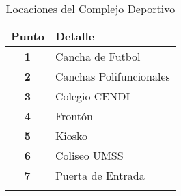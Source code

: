     \begin{longtable}{ c  X }
      \toprule
        \textbf{Punto} &
        \textbf{Detalle}\\

      \midrule
      \endhead

  \textbf{1}
  &
  Cancha de Futbol
  \\
  \textbf{2}
  &
  Canchas Polifuncionales
  \\
  \textbf{3}
  &
  Colegio CENDI
  \\
  \textbf{4}
  &
  Frontón
  \\
  \textbf{5}
  &
  Kiosko
  \\
  \textbf{6}
  &
  Coliseo UMSS
  \\
  \textbf{7}
  &
  Puerta de Entrada
  \\
      \bottomrule
      \caption{Locaciones del Complejo Deportivo}
      \label{tab:canchas}
    \end{longtable}
